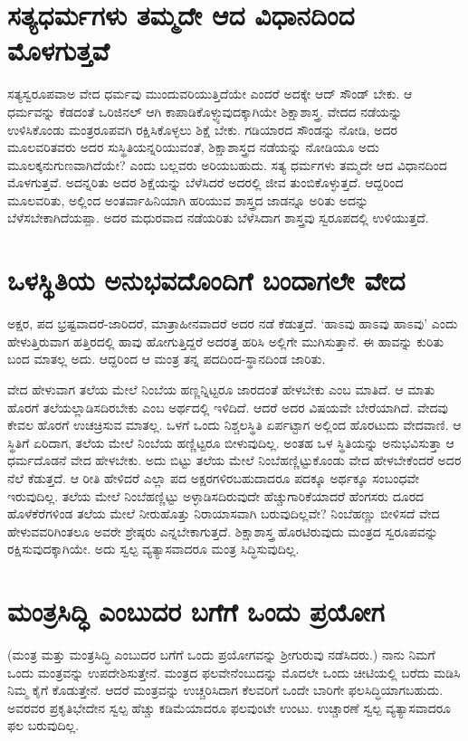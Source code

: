 \section*{ಸತ್ಯಧರ್ಮಗಳು ತಮ್ಮದೇ ಆದ ವಿಧಾನದಿಂದ ಮೊಳಗುತ್ತವೆ}

 ಸತ್ಯಸ್ವರೂಪವಾಅ ವೇದ ಧರ್ಮವು ಮುಂದುವರಿಯುತ್ತಿದೆಯೇ ಎಂದರೆ ಅದಕ್ಕೇ ಆದ್ ಸೌಂಡ್ ಬೇಕು. ಆ ಧರ್ಮವನ್ನು ಕೆಡದಂತೆ ಒರಿಜಿನಲ್ ಆಗಿ ಕಾಪಾಡಿಕೊಳ್ಳ್ಯುವುದಕ್ಕಾಗಿಯೇ ಶಿಕ್ಷಾಶಾಸ್ತ್ರ. ವೇದದ ನಡೆಯನ್ನು ಉಳಿಸಿಕೊಂಡು ಮಂತ್ರರೂಪವಗಿ ರಕ್ಷಿಸಿಕೊಳ್ಳಲು ಶಿಕ್ಷೆ ಬೇಕು. ಗಡಿಯಾರದ ಸೌಂಡನ್ನು ನೋಡಿ, ಅದರ ಮೂಲವರಿತವರು ಅದರ ಸುಸ್ಥಿತಿಯನ್ನರಿಯುವಂತೆ, ಶಿಕ್ಷಾಶಾಸ್ತ್ರದ ನಡೆಯನ್ನು ನೋಡಿಯೂ ಅದು ಮೂಲಕ್ಕನುಗುಣವಾಗಿದೆಯೇ? ಎಂದು ಬಲ್ಲವರು ಅರಿಯಬಹುದು. ಸತ್ಯ ಧರ್ಮಗಳು ತಮ್ಮದೇ ಆದ ವಿಧಾನದಿಂದ ಮೊಳಗುತ್ತವೆ. ಅದನ್ನರಿತು ಅದರ ಶಿಕ್ಷೆಯನ್ನು ಬೆಳೆಸಿದರೆ ಅದರಲ್ಲಿ ಜೀವ ತುಂಬಿಕೊಳ್ಳುತ್ತದೆ. ಆದ್ದರಿಂದ ಮೂಲವರಿತು, ಅಲ್ಲಿಂದ ಅಂತರ್ವಾಹಿನಿಯಾಗಿ ಹರಿಯುವ ಶಾಸ್ತ್ರದ ಜಾಡನ್ನೂ ಅರಿತು ಅದನ್ನು ಬೆಳೆಸಬೇಕಾಗಿದೆಯಪ್ಪಾ. ಅದರ ಮಧುರವಾದ ನಡೆಯರಿತು ಬೆಳೆಸಿದಾಗ ಶಾಸ್ತ್ರವು ಸ್ವರೂಪದಲ್ಲಿ ಉಳಿಯುತ್ತದೆ.

\section*{ಒಳಸ್ಥಿತಿಯ ಅನುಭವದೊಂದಿಗೆ ಬಂದಾಗಲೇ ವೇದ}

ಅಕ್ಷರ, ಪದ ಭ್ರಷ್ಟವಾದರೆ-ಜಾರಿದರೆ, ಮಾತ್ರಾಹೀನವಾದರೆ ಅದರ ನಡೆ ಕೆಡುತ್ತದೆ. `ಹಾಽವು ಹಾಽವು ಹಾಽವು' ಎಂದು ಹೇಳುತ್ತಿರುವಾಗ ಹತ್ತಿರದಲ್ಲಿ ಹಾವು ಹೋಗುತ್ತಿದ್ದರೆ ಅದರತ್ತ ಹರಿಸಿ ಅಲ್ಲಿಗೇ ಮುಗಿಸುತ್ತಾನೆ. ಈ ಹಾವನ್ನು ಕುರಿತು ಬಂದ ಮಾತಲ್ಲ ಅದು. ಆದ್ದರಿಂದ ಆ ಮಂತ್ರ ತನ್ನ ಪದದಿಂದ-ಸ್ಥಾನದಿಂಡ ಜಾರಿತು.

ವೇದ ಹೇಳುವಾಗ ತಲೆಯ ಮೇಲೆ ನಿಂಬೆಯ ಹಣ್ಣನ್ನಿಟ್ಟರೂ ಜಾರದಂತೆ ಹೇಳಬೇಕು ಎಂಬ ಮಾತಿದೆ. ಆ ಮಾತು ಹೊರಗೆ ತಲೆಯಲ್ಲಾಡಿಸದಿರಬೇಕು ಎಂಬ ಅರ್ಥದಲ್ಲಿ ಇಳಿದಿದೆ. ಆದರೆ ಅದರ ವಿಷಯವೇ ಬೇರೆಯಾಗಿದೆ. ವೇದವು ಕೇವಲ ಹೊರಗೆ ಉಚಚ್ರಿಸುವ ಮಾತಲ್ಲ. ಒಳಗೆ ಒಂದು ನಿಶ್ಚಲಸ್ಥಿತಿ ಏರ್ಪಟ್ಟಾಗ ಅಲ್ಲಿಂದ ಹೊರಟುದು ವೇದವಾಣಿ. ಆ ಸ್ಥಿತಿಗೆ ಏರಿದಾಗ, ತಲೆಯ ಮೇಲೆ ನಿಂಬೆಯ ಹಣ್ಣಿಟ್ಟರೂ ಬೀಳುವುದಿಲ್ಲ. ಅಂತಹ ಒಳ ಸ್ಥಿತಿಯನ್ನು ಅನುಭವಿಸುತ್ತಾ ಆ ಧರ್ಮದೊಡನೆ ವೇದ ಹೇಳಬೇಕು. ಅದು ಬಿಟ್ಟು ತಲೆಯ ಮೇಲೆ ನಿಂಬೆಹಣ್ಣಿಟ್ಟುಕೊಂಡು ವೇದ ಹೇಳಬೇಕೆಂದರೆ ಅದರ ನೆಲೆ ಕೆಡುತ್ತದೆ. ಆ ರೀತಿ ಹೇಳಿದರೆ ಎಲ್ಲಾ ಪದ ಅಕ್ಷರಗಳಿರಬಹುದಾದರೂ ಪದಕ್ಕೂ ಅರ್ಥಕ್ಕೂ ಸಂಬಂಧವೇ ಇರುವುದಿಲ್ಲ. ತಲೆಯ ಮೇಲೆ ನಿಂಬೆಹಣ್ಣಿಟ್ಟು ಅಳ್ಳಾಡಿಸದಿರುವುದೇ ಹೆಚ್ಚುಗಾರಿಕೆಯಾದರೆ ಹೆಂಗಸರು ದೂರದ ಹೊಳೆಕೆರೆಗಳಿಂಡ ತಲೆಯ ಮೇಲೆ ನೀರುಹೊತ್ತು ನಿರಾಯಾಸವಾಗಿ ಬರುವುದಿಲ್ಲವೇ? ನಿಂಬೆಹಣ್ಣು ಬೀಳಿಸದೆ ವೇದ ಹೇಳುವವರಿಗಿಂತಲೂ ಅವರೇ ಶ್ರೇಷ್ಠರು ಎನ್ನಬೇಕಾಗುತ್ತದೆ. ಶಿಕ್ಷಾಶಾಸ್ತ್ರ ಹೊರಟಿರುವುದು ಮಂತ್ರದ ಸ್ವರೂಪವನ್ನು ರಕ್ಷಿಸುವುದಕ್ಕಾಗಿಯೇ. ಅದು ಸ್ವಲ್ಪ ವ್ಯತ್ಯಾಸವಾದರೂ ಮಂತ್ರ ಸಿದ್ಧಿಸುವುದಿಲ್ಲ.

\section*{ಮಂತ್ರಸಿದ್ಧಿ ಎಂಬುದರ ಬಗೆಗೆ ಒಂದು ಪ್ರಯೋಗ}

(ಮಂತ್ರ ಮತ್ತು ಮಂತ್ರಸಿದ್ಧಿ ಎಂಬುದರ ಬಗೆಗೆ ಒಂದು ಪ್ರಯೋಗವನ್ನು  ಶ್ರೀಗುರುವು ನಡೆಸಿದರು.) ನಾನು ನಿಮಗೆ ಒಂದು ಮಂತ್ರವನ್ನು ಉಪದೇಶಿಸುತ್ತೇನೆ. ಮಂತ್ರದ ಫಲವೇನೆಂಬುದನ್ನು ಮೊದಲೇ ಒಂದು ಚೀಟಿಯಲ್ಲಿ ಬರೆದು ಮಡಿಸಿ ನಿಮ್ಮ ಕೈಗೆ ಕೊಡುತ್ತೇನೆ. ಆದರೆ ಮಂತ್ರವನ್ನು ಉಚ್ಚರಿಸಿದಾಗ ಕೆಲವರಿಗೆ ಒಂದೇ ಬಾರಿಗೇ ಫಲಸಿದ್ಧಿಯಾಗಬಹುದು. ಅವರವರ ಪ್ರಕೃತಿಭೇದೇನ ಸ್ವಲ್ಪ ಹೆಚ್ಚು ಕಡಿಮೆಯಾದರೂ ಫಲವುಂಟೇ ಉಂಟು. ಉಚ್ಚಾರಣೆ ಸ್ವಲ್ಪ ವ್ಯತ್ಯಾಸವಾದರೂ ಫಲ ಬರುವುದಿಲ್ಲ.

